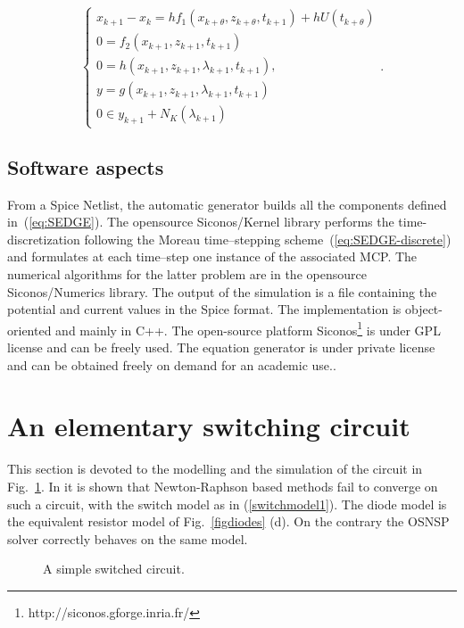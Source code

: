 \begin{equation}
  \label{eq:SEDGE-discrete}
  \left\{{  
      \begin{array}{l }
        x_{k+1}- x_{k} 
        = h f_1(x_{k+\theta},z_{k+\theta},t_{k+1}) + h U(t_{k+\theta}) \\
        0    =  f_2(x_{k+1},z_{k+1},t_{k+1})
        \\[2mm]
        0 = h(x_{k+1},z_{k+1},\lambda_{k+1},t_{k+1}),\\
        y = g(x_{k+1},z_{k+1},\lambda_{k+1},t_{k+1})\\
        0 \in y_{k+1} + N_K(\lambda_{k+1})
      \end{array}
    }\right. .
\end{equation}

\subsection{Software aspects} From a {\sc Spice} Netlist, the automatic generator builds all the components defined in~(\ref{eq:SEDGE}). The opensource {\sc Siconos/Kernel} library performs the time-discretization following the Moreau time--stepping scheme~(\ref{eq:SEDGE-discrete}) and formulates at each time--step one instance of the associated MCP. The numerical algorithms for the latter problem are in the opensource {\sc Siconos/Numerics} library. The output of the simulation is a file containing the potential and current values in the {\sc Spice} format. The implementation is object-oriented and mainly in C++. The open-source platform {\sc Siconos}\footnote{http://siconos.gforge.inria.fr/}\cite{acary-brogliato2008,Acary-Perignon2007,mathmod} is under GPL license and can be freely used. The equation generator is under private license and can be obtained freely on demand for an academic use.. 


\section{An elementary switching circuit}
\label{section3}


This section is devoted to the  modelling and the simulation of the circuit in Fig.~\ref{fig:figcircuit1}. In \cite{maffezzoni2006} it is shown that Newton-Raphson based methods fail to converge on such a circuit, with the switch model as in (\ref{switchmodel1}). The diode model is the equivalent resistor model of Fig.~\ref{figdiodes} (d). On the contrary the OSNSP solver correctly behaves on the same model.  
\begin{figure}[h]
  \centering
   \resizebox{\linewidth}{!}{
  
  }
  \caption{A simple switched circuit.}
  \label{fig:figcircuit1}
\end{figure}
